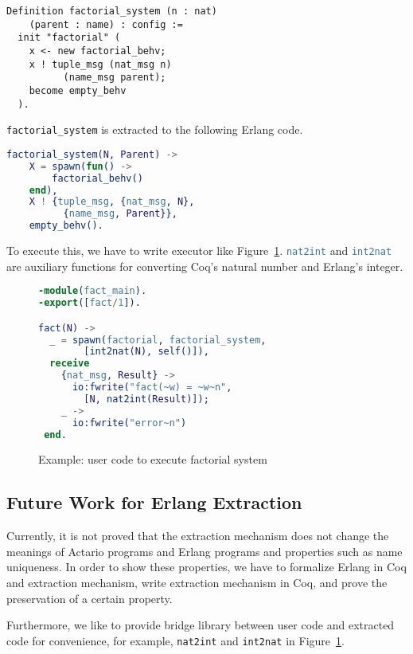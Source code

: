 \begin{lstlisting}
Definition factorial_system (n : nat)
    (parent : name) : config :=
  init "factorial" (
    x <- new factorial_behv;
    x ! tuple_msg (nat_msg n)
          (name_msg parent);
    become empty_behv
  ).
\end{lstlisting}

\lstinline|factorial_system| is extracted to the following Erlang code.

\begin{lstlisting}[language=erlang]
factorial_system(N, Parent) ->
    X = spawn(fun() ->
        factorial_behv()
    end),
    X ! {tuple_msg, {nat_msg, N},
          {name_msg, Parent}},
    empty_behv().
\end{lstlisting}

To execute this, we have to write executor like Figure~\ref{fig:erl:user}.
\lstinline[language=erlang]|nat2int| and \lstinline[language=erlang]|int2nat| are auxiliary functions for converting Coq's natural number and Erlang's integer.

\begin{figure}
\begin{lstlisting}[language=erlang]
-module(fact_main).
-export([fact/1]).

fact(N) ->
  _ = spawn(factorial, factorial_system,
        [int2nat(N), self()]),
  receive
    {nat_msg, Result} ->
      io:fwrite("fact(~w) = ~w~n",
        [N, nat2int(Result)]);
    _ ->
      io:fwrite("error~n")
 end.
\end{lstlisting}
\caption{Example: user code to execute factorial system}\label{fig:erl:user}
\end{figure}

\subsection{Future Work for Erlang Extraction}
Currently, it is not proved that the extraction mechanism does not change the meanings of Actario programs and Erlang programs and properties such as name uniqueness.
In order to show these properties, we have to formalize Erlang in Coq and extraction mechanism, write extraction mechanism in Coq, and prove the preservation of a certain property.

Furthermore, we like to provide bridge library between user code and extracted code for convenience, for example, \texttt{nat2int} and \texttt{int2nat} in Figure~\ref{fig:erl:user}.

